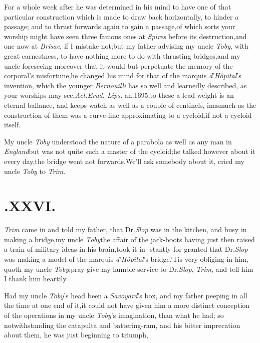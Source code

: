 \documentclass{article}
\begin{document}
For a whole week after he was determined in his mind to have one
of that particular construction which is made to draw back
horizontally, to hinder a passage; and to thrust forwards again to
gain a passage,\tsk of which sorts your worship might have seen
three famous ones at \textit{Spires} before its destruction,\tsk and
one now at \textit{Brisac}, if I mistake not;\tsk but my father
advising my uncle \textit{Toby}, with great earnestness, to have
nothing more to do with thrusting bridges,\tsk and my uncle
foreseeing moreover that it would but perpetuate the memory of the
corporal’s misfortune,\tsk he changed his mind for that of
the marquis \textit{d}’\textit{Hôpital}’s invention,
which the younger \textit{Bernouilli} has so well and learnedly
described, as your worships may see,\tsh \textit{Act.\@ Erud.\@
Lips.\@} an.\@ 1695,\tsk to these a lead weight is an eternal
ballance, and keeps watch as well as a couple of centinels, inasmuch
as the construction of them was a curve-line approximating to a
cycloid,\tsh if not a cycloid itself.

My uncle \textit{Toby} understood the nature of a parabola as well
as any man in \textit{England}\tsk but was not quite such a master
of the cycloid;\tsk he talked however about it every
day,\tsh the bridge went not
forwards.\tsh We’ll ask somebody about it, cried my
uncle \textit{Toby} to \textit{Trim}.

\null
\section{.\quad  XXVI.}

 \textit{Trim} came in and told my
father, that Dr.\@ \textit{Slop} was in the\break
kitchen, and busy in making a bridge,\tsk my uncle
\textit{Toby}\tsh the affair of the jack-boots having just then
raised a train of military ideas in his brain,\tsh took it
in-
stantly for granted that Dr.\@ \textit{Slop} was making a model
of the marquis \textit{d}’\textit{Hôpital}’s bridge.\tsh ’Tis
very obliging in him, quoth my uncle \textit{Toby};\tsk pray
give my humble service to Dr.\@ \textit{Slop}, \textit{Trim},
and tell him I thank him heartily.

Had my uncle \textit{Toby}’s head been a \textit{Sa\-voyard}’s box, and my father
peeping in all the time at one end of it,\tsk it could not have given him a more
distinct conception of the operations in my uncle \textit{Toby}’s imagination, than
what he had; so notwithstanding the catapulta and bat\-tering-ram, and his bitter
imprecation\break
about them, he was just beginning to triumph,\tsh
\end{document}
